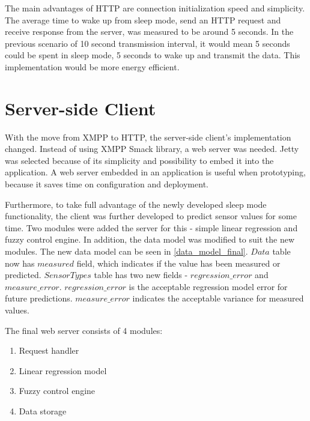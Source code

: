 The main advantages of HTTP are connection initialization speed and simplicity. The average time to wake up from sleep mode, send an HTTP request and receive response from the server, was measured to be around 5 seconds. In the previous scenario of 10 second transmission interval, it would mean 5 seconds could be spent in sleep mode, 5 seconds to wake up and transmit the data. This implementation would be more energy efficient. 


\section{Server-side Client}

With the move from XMPP to HTTP, the server-side client's implementation changed. Instead of using XMPP Smack library, a web server was needed. Jetty was selected because of its simplicity and possibility to embed it into the application. A web server embedded in an application is useful when prototyping, because it saves time on configuration and deployment. 

Furthermore, to take full advantage of the newly developed sleep mode functionality, the client was further developed to predict sensor values for some time. Two modules were added the server for this - simple linear regression and fuzzy control engine. In addition, the data model was modified to suit the new modules. The new data model can be seen in \autoref{data_model_final}. $Data$ table now has $measured$ field, which indicates if the value has been measured or predicted. $SensorTypes$ table has two new fields - $regression\_error$ and $measure\_error$. $regression\_error$ is the acceptable regression model error for future predictions. $measure\_error$ indicates the acceptable variance for measured values. 

The final web server consists of 4 modules:
\begin{enumerate}
\item Request handler
\item Linear regression model
\item Fuzzy control engine
\item Data storage
\end{enumerate}


